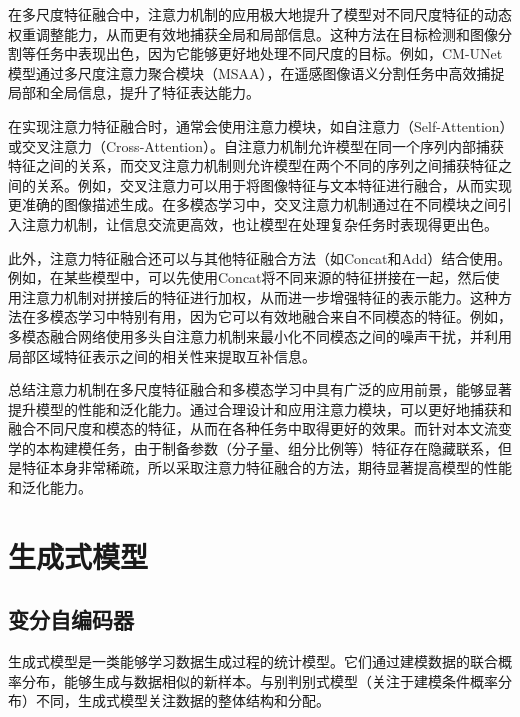 在多尺度特征融合中，注意力机制的应用极大地提升了模型对不同尺度特征的动态权重调整能力，从而更有效地捕获全局和局部信息。这种方法在目标检测和图像分割等任务中表现出色，因为它能够更好地处理不同尺度的目标。例如，CM-UNet模型通过多尺度注意力聚合模块（MSAA），在遥感图像语义分割任务中高效捕捉局部和全局信息，提升了特征表达能力\cite{Cui2023CMUnet}。

在实现注意力特征融合时，通常会使用注意力模块，如自注意力（Self-Attention）或交叉注意力（Cross-Attention）。自注意力机制允许模型在同一个序列内部捕获特征之间的关系，而交叉注意力机制则允许模型在两个不同的序列之间捕获特征之间的关系。例如，交叉注意力可以用于将图像特征与文本特征进行融合，从而实现更准确的图像描述生成。在多模态学习中，交叉注意力机制通过在不同模块之间引入注意力机制，让信息交流更高效，也让模型在处理复杂任务时表现得更出色\cite{rong2023dynstatf}。

此外，注意力特征融合还可以与其他特征融合方法（如Concat和Add）结合使用。例如，在某些模型中，可以先使用Concat将不同来源的特征拼接在一起，然后使用注意力机制对拼接后的特征进行加权，从而进一步增强特征的表示能力。这种方法在多模态学习中特别有用，因为它可以有效地融合来自不同模态的特征。例如，多模态融合网络使用多头自注意力机制来最小化不同模态之间的噪声干扰，并利用局部区域特征表示之间的相关性来提取互补信息\cite{nagrani2021attention}。

总结注意力机制在多尺度特征融合和多模态学习中具有广泛的应用前景，能够显著提升模型的性能和泛化能力。通过合理设计和应用注意力模块，可以更好地捕获和融合不同尺度和模态的特征，从而在各种任务中取得更好的效果。而针对本文流变学的本构建模任务，由于制备参数（分子量、组分比例等）特征存在隐藏联系，但是特征本身非常稀疏，所以采取注意力特征融合的方法，期待显著提高模型的性能和泛化能力。
\section{生成式模型}
\subsection{变分自编码器}
生成式模型是一类能够学习数据生成过程的统计模型。它们通过建模数据的联合概率分布，能够生成与数据相似的新样本。与别判别式模型（关注于建模条件概率分布）不同，生成式模型关注数据的整体结构和分配。

